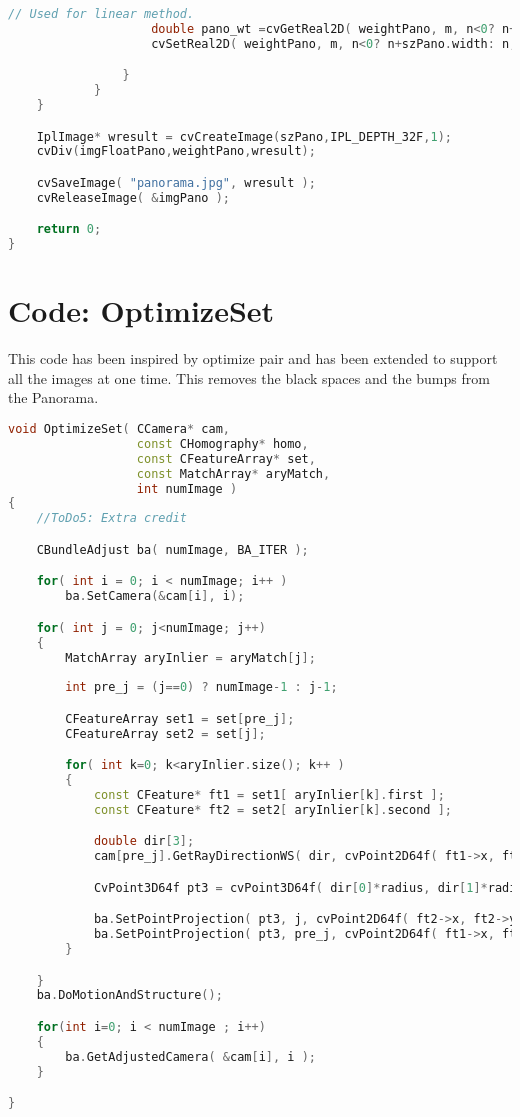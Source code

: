 \documentclass[11pt]{article}
\begin{document}
\begin{lstlisting}[language=C++, caption={ImageBlending}, label=code4]
                    // Used for linear method.
                    double pano_wt =cvGetReal2D( weightPano, m, n<0? n+szPano.width: n);
                    cvSetReal2D( weightPano, m, n<0? n+szPano.width: n, pano_wt+wt );

                }
            }
    }

    IplImage* wresult = cvCreateImage(szPano,IPL_DEPTH_32F,1);
    cvDiv(imgFloatPano,weightPano,wresult);

    cvSaveImage( "panorama.jpg", wresult );
    cvReleaseImage( &imgPano );

    return 0;
}
\end{lstlisting}
\section{Code: OptimizeSet}
This code has been inspired by optimize pair and has been extended to support all the images at one time. This removes the black spaces and the bumps from the Panorama.
\begin{lstlisting}[language=C++, caption={OptimizeSet}, label=code5]
void OptimizeSet( CCamera* cam,
                  const CHomography* homo, 
                  const CFeatureArray* set,
                  const MatchArray* aryMatch,
                  int numImage )
{
    //ToDo5: Extra credit

    CBundleAdjust ba( numImage, BA_ITER );

    for( int i = 0; i < numImage; i++ )
        ba.SetCamera(&cam[i], i);

    for( int j = 0; j<numImage; j++)
    {
        MatchArray aryInlier = aryMatch[j];
       
        int pre_j = (j==0) ? numImage-1 : j-1;

        CFeatureArray set1 = set[pre_j];
        CFeatureArray set2 = set[j];

        for( int k=0; k<aryInlier.size(); k++ )
        {
            const CFeature* ft1 = set1[ aryInlier[k].first ];
            const CFeature* ft2 = set2[ aryInlier[k].second ];

            double dir[3];
            cam[pre_j].GetRayDirectionWS( dir, cvPoint2D64f( ft1->x, ft1->y ) );

            CvPoint3D64f pt3 = cvPoint3D64f( dir[0]*radius, dir[1]*radius, dir[2]*radius );

            ba.SetPointProjection( pt3, j, cvPoint2D64f( ft2->x, ft2->y ) );
            ba.SetPointProjection( pt3, pre_j, cvPoint2D64f( ft1->x, ft1->y ) );
        }

    }
    ba.DoMotionAndStructure();

    for(int i=0; i < numImage ; i++)
    {
        ba.GetAdjustedCamera( &cam[i], i );
    }

}


\end{lstlisting}
\end{document}
